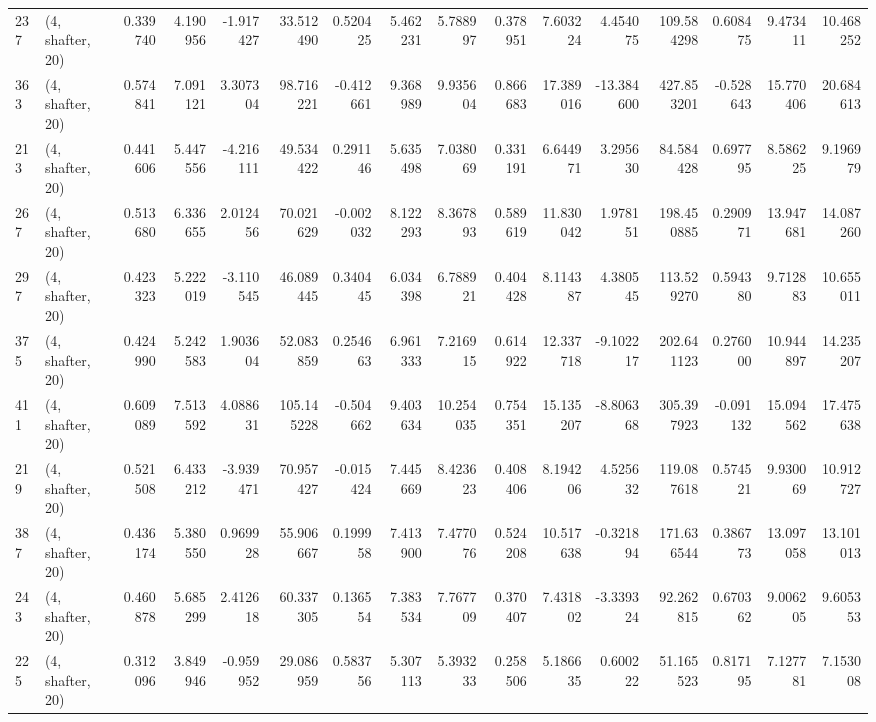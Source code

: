\begin{tabular}{llrrrrrrrrrrrrrr}
237 &  (4, shafter, 20) &   0.339740 &   4.190956 &  -1.917427 &    33.512490 &   0.520425 &   5.462231 &   5.788997 &  0.378951 &   7.603224 &   4.454075 &   109.584298 &  0.608475 &   9.473411 &  10.468252 \\
363 &  (4, shafter, 20) &   0.574841 &   7.091121 &   3.307304 &    98.716221 &  -0.412661 &   9.368989 &   9.935604 &  0.866683 &  17.389016 & -13.384600 &   427.853201 & -0.528643 &  15.770406 &  20.684613 \\
213 &  (4, shafter, 20) &   0.441606 &   5.447556 &  -4.216111 &    49.534422 &   0.291146 &   5.635498 &   7.038069 &  0.331191 &   6.644971 &   3.295630 &    84.584428 &  0.697795 &   8.586225 &   9.196979 \\
267 &  (4, shafter, 20) &   0.513680 &   6.336655 &   2.012456 &    70.021629 &  -0.002032 &   8.122293 &   8.367893 &  0.589619 &  11.830042 &   1.978151 &   198.450885 &  0.290971 &  13.947681 &  14.087260 \\
297 &  (4, shafter, 20) &   0.423323 &   5.222019 &  -3.110545 &    46.089445 &   0.340445 &   6.034398 &   6.788921 &  0.404428 &   8.114387 &   4.380545 &   113.529270 &  0.594380 &   9.712883 &  10.655011 \\
375 &  (4, shafter, 20) &   0.424990 &   5.242583 &   1.903604 &    52.083859 &   0.254663 &   6.961333 &   7.216915 &  0.614922 &  12.337718 &  -9.102217 &   202.641123 &  0.276000 &  10.944897 &  14.235207 \\
411 &  (4, shafter, 20) &   0.609089 &   7.513592 &   4.088631 &   105.145228 &  -0.504662 &   9.403634 &  10.254035 &  0.754351 &  15.135207 &  -8.806368 &   305.397923 & -0.091132 &  15.094562 &  17.475638 \\
219 &  (4, shafter, 20) &   0.521508 &   6.433212 &  -3.939471 &    70.957427 &  -0.015424 &   7.445669 &   8.423623 &  0.408406 &   8.194206 &   4.525632 &   119.087618 &  0.574521 &   9.930069 &  10.912727 \\
387 &  (4, shafter, 20) &   0.436174 &   5.380550 &   0.969928 &    55.906667 &   0.199958 &   7.413900 &   7.477076 &  0.524208 &  10.517638 &  -0.321894 &   171.636544 &  0.386773 &  13.097058 &  13.101013 \\
243 &  (4, shafter, 20) &   0.460878 &   5.685299 &   2.412618 &    60.337305 &   0.136554 &   7.383534 &   7.767709 &  0.370407 &   7.431802 &  -3.339324 &    92.262815 &  0.670362 &   9.006205 &   9.605353 \\
225 &  (4, shafter, 20) &   0.312096 &   3.849946 &  -0.959952 &    29.086959 &   0.583756 &   5.307113 &   5.393233 &  0.258506 &   5.186635 &   0.600222 &    51.165523 &  0.817195 &   7.127781 &   7.153008 \\

\end{tabular}
